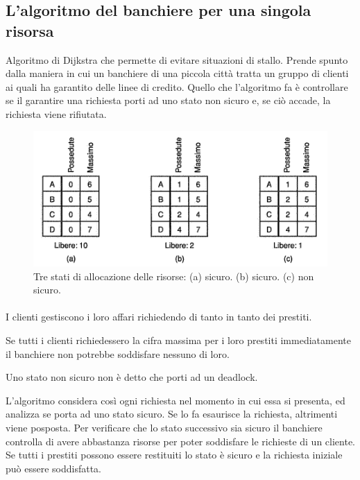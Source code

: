 \subsection{L'algoritmo del banchiere per una singola risorsa}
Algoritmo di Dijkstra che permette di evitare situazioni di stallo. Prende spunto dalla maniera in cui un banchiere di una piccola città tratta un gruppo di clienti ai quali ha garantito delle linee di credito. Quello che l'algoritmo fa è controllare se il garantire una richiesta porti ad uno stato non sicuro e, se ciò accade, la richiesta viene rifiutata.

\begin{figure}[H]
    \centering
    \includegraphics[width=0.6\linewidth]{assets/banchiere9.png}
    \caption{Tre stati di allocazione delle risorse: (a) sicuro. (b) sicuro. (c) non sicuro.}
\end{figure}

\paragraph*{}
\paragraph*{}
I clienti gestiscono i loro affari richiedendo di tanto in tanto dei prestiti. 

Se tutti i clienti richiedessero la cifra massima per i loro prestiti immediatamente il banchiere non potrebbe soddisfare nessuno di loro. 

Uno stato non sicuro non è detto che porti ad un deadlock.

L'algoritmo considera così ogni richiesta nel momento in cui essa si presenta, ed analizza se porta ad uno stato sicuro. Se lo fa esaurisce la richiesta, altrimenti viene posposta. Per verificare che lo stato successivo sia sicuro il banchiere controlla di avere abbastanza risorse per poter soddisfare le richieste di un cliente. Se tutti i prestiti possono essere restituiti lo stato è sicuro e la richiesta iniziale può essere soddisfatta.


\paragraph*{}
